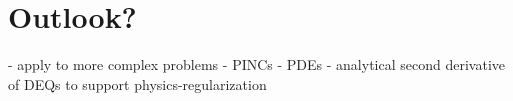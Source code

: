 
\section{Outlook?}

- apply to more complex problems
    - PINCs
    - PDEs
- analytical second derivative of DEQs to support physics-regularization

